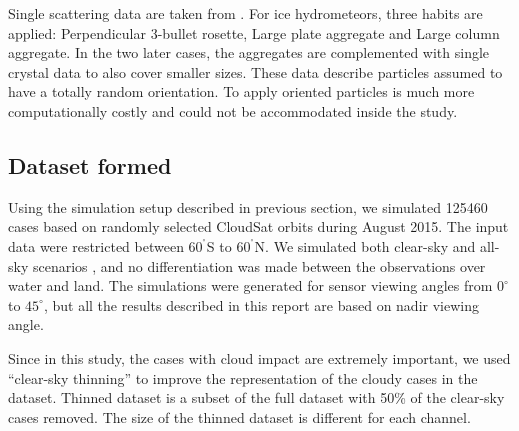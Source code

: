 \documentclass[12pt]{article}
\newcommand{\degree}{\ensuremath{\mathrm{^\circ}}}
\begin{document}
Single scattering data are taken from \citet{eriksson:agene:18}. For ice
hydrometeors, three habits are applied: Perpendicular 3-bullet rosette, Large
plate aggregate and Large column aggregate. In the two later cases, the
aggregates are complemented with single crystal data to also cover smaller
sizes. These data describe particles assumed to have a totally random
orientation. To apply oriented particles is much more computationally costly
and could not be accommodated inside the study.


\subsection{Dataset formed}
%
Using the simulation setup described in previous section, we simulated 125460 cases based on randomly selected CloudSat orbits during August 2015. The input data
were restricted between $60^{\degree}$S to $60^{\degree}$N. We simulated both clear-sky and all-sky scenarios , and no differentiation was made between the observations over water and land. The simulations were generated for sensor viewing angles from $0^\circ$ to $45^\circ$, but all the results described in this report are based on nadir viewing angle.

Since in this study, the cases with cloud impact are extremely important, we used ``clear-sky thinning'' to improve the representation of the cloudy cases in the dataset. Thinned dataset is a subset of the full dataset with 50\% of the clear-sky cases removed. The size of the thinned dataset is different for each channel. 
\end{document}
